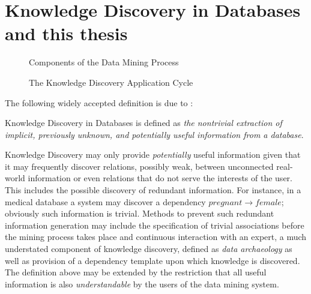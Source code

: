 \section{Knowledge Discovery in Databases and this thesis}\label{sec:int_kdd}

 
\begin{figure}
\centerline{}
\caption{\label{fig:dm_process}Components of the Data
Mining Process}
\end{figure}
  
 
\begin{figure}
\centerline{}
\caption{\label{fig:kd_process}The Knowledge Discovery
Application Cycle}
\end{figure}

The following widely accepted definition is due to \cite{kdd96}:

\begin{definition}
\begin{rm} Knowledge Discovery in Databases is defined as {\em the nontrivial extraction of implicit, previously unknown, and potentially useful information from a database}.   
\end{rm}
\end{definition}

Knowledge Discovery may only provide {\em potentially} useful
information given that it may frequently discover relations, possibly
weak, between unconnected real-world information or even relations
that do not serve the interests of the user.  This includes the
possible discovery of redundant information. For instance, in a
medical database a system may discover a dependency $pregnant
\rightarrow female$; obviously such information is trivial.  Methods
to prevent such redundant information generation may include the
specification of trivial associations before the mining process takes
place and continuous interaction with an expert, a much understated
component of knowledge discovery, defined as {\em data
archaeology} as well as provision of a dependency template upon which
knowledge is discovered. The definition above may be extended by the restriction
that all useful information is also {\em understandable} by the users
of the data mining system. 

